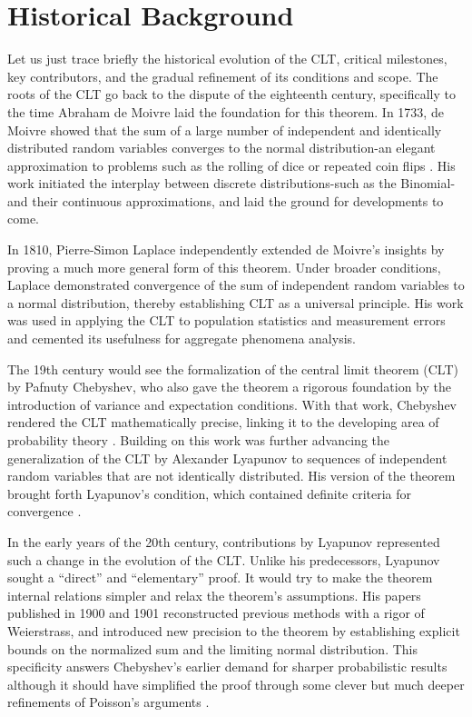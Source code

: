 \section{Historical Background}
Let us just trace briefly the historical evolution of the CLT, critical milestones, key contributors, and the gradual refinement of its conditions and scope. The roots of the CLT go back to the dispute of the eighteenth century, specifically to the time Abraham de Moivre laid the foundation for this theorem. In 1733, de Moivre showed that the sum of a large number of independent and identically distributed random variables converges to the normal distribution-an elegant approximation to problems such as the rolling of dice or repeated coin flips \cite{de1733approximatio}. His work initiated the interplay between discrete distributions-such as the Binomial-and their continuous approximations, and laid the ground for developments to come.

In 1810, Pierre-Simon Laplace independently extended de Moivre's insights by proving a much more general form of this theorem. Under broader conditions, Laplace demonstrated convergence of the sum of independent random variables to a normal distribution, thereby establishing CLT as a universal principle. His work was used in applying the CLT to population statistics and measurement errors \cite{laplace1835oeuvres} and cemented its usefulness for aggregate phenomena analysis.

The 19th century would see the formalization of the central limit theorem (CLT) by Pafnuty Chebyshev, who also gave the theorem a rigorous foundation by the introduction of variance and expectation conditions. With that work, Chebyshev rendered the CLT mathematically precise, linking it to the developing area of probability theory \cite{chebyshev1890deux}. Building on this work was further advancing the generalization of the CLT by Alexander Lyapunov to sequences of independent random variables that are not identically distributed. His version of the theorem brought forth Lyapunov's condition, which contained definite criteria for convergence \cite{lyapunov1895pafnutii}.

In the early years of the 20th century, contributions by Lyapunov represented such a change in the evolution of the CLT. Unlike his predecessors, Lyapunov sought a “direct” and “elementary” proof. It would try to make the theorem internal relations simpler and relax the theorem's assumptions. His papers published in 1900 and 1901 reconstructed previous methods with a rigor of Weierstrass, and introduced new precision to the theorem by establishing explicit bounds on the normalized sum and the limiting normal distribution. This specificity answers Chebyshev's earlier demand for sharper probabilistic results although it should have simplified the proof through some clever but much deeper refinements of Poisson's arguments \cite{fischer2011history}.

